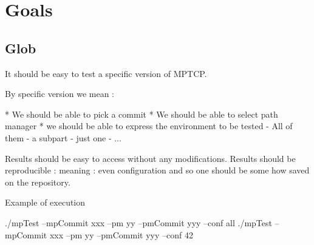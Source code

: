 \section{Goals}

\subsection{Glob}
It should be easy to test a specific version of MPTCP.

By specific version we mean :

* We should be able to pick a commit
* We should be able to select path manager
* we should be able to express the environment to be tested
	- All of them
	- a subpart
	- just one
	- ...

Results should be easy to access without any modifications.
Results should be reproducible : meaning : even configuration and so one should
be some how saved on the repository.

Example of execution

./mpTest --mpCommit xxx --pm yy --pmCommit yyy --conf all
./mpTest --mpCommit xxx --pm yy --pmCommit yyy --conf 42



